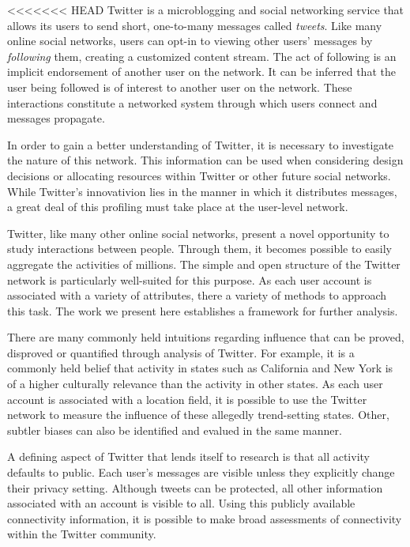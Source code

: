 <<<<<<< HEAD
Twitter is a microblogging and social networking service that allows its users to send short, one-to-many messages called \textit{tweets}.  Like many online social networks, users can opt-in to viewing other users' messages by \textit{following} them, creating a customized content stream.  The act of following is an implicit endorsement of another user on the network.  It can be inferred that the user being followed is of interest to another user on the network.  These interactions constitute a networked system through which users connect and messages propagate.

In order to gain a better understanding of Twitter, it is necessary to investigate the nature of this network.  This information can be used when considering design decisions or allocating resources within Twitter or other future social networks.  While Twitter's innovativion lies in the manner in which it distributes messages, a great deal of this profiling must take place at the user-level network.

Twitter, like many other online social networks, present a novel opportunity to study interactions between people.  Through them, it becomes possible to easily aggregate the activities of millions.  The simple and open structure of the Twitter network is particularly well-suited for this purpose.  As each user account is associated with a variety of attributes, there a variety of methods to approach this task.  The work we present here establishes a framework for further analysis.

There are many commonly held intuitions regarding influence that can be proved, disproved or quantified through analysis of Twitter.  For example, it is a commonly held belief that activity in states such as California and New York is of a higher culturally relevance than the activity in other states.  As each user account is associated with a location field, it is possible to use the Twitter network to measure the influence of these allegedly trend-setting states.  Other, subtler biases can also be identified and evalued in the same manner.

A defining aspect of Twitter that lends itself to research is that all activity defaults to public.  Each user's messages are visible unless they explicitly change their privacy setting.  Although tweets can be protected, all other information associated with an account is visible to all.  Using this publicly available connectivity information, it is possible to make broad assessments of connectivity within the Twitter community.

